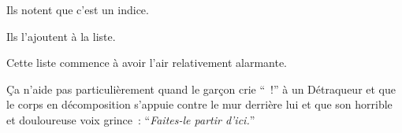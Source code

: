 Ils notent que c'est un indice.

Ils l'ajoutent à la liste.

Cette liste commence à avoir l'air relativement alarmante.

Ça n'aide pas particulièrement quand le garçon crie “~!” à un Détraqueur et que le corps en décomposition s'appuie contre le mur derrière lui et que son horrible et douloureuse voix grince~: “\emph{Faites-le partir d'ici.}”

